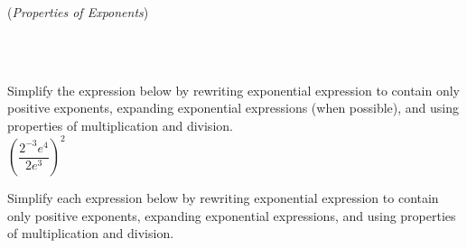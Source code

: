 \documentclass[10pt]{article}
\begin{document}
\thispagestyle{empty}


\vspace{0.1in}

\Name{} \quad {}

\hrulefill

\begin{center}
({\it Properties of Exponents})
\end{center}

\,\hfill
{}
\hfill
{}
\hfill
{}
\hfill
{}
\hfill
\,\\

\,\hfill\hfill
{}
\hfill
{}
\hfill
{}
\hfill\hfill\,



 Simplify the expression below by rewriting exponential expression to contain only positive exponents, expanding exponential expressions (when possible), and using properties of multiplication and division.\\

$\left( \dfrac{ 2^{-3}e^4 }{ 2e^3 } \right)^2$

{
\blue{\[\left( \dfrac{ 2^{-3}e^4 }{ 2e^3 } \right)^2 = \left( \dfrac{ e^{4-3} }{ 2\cdot2^{3} } \right)^2 = \left( \dfrac{ e }{ 2^{1+3} } \right)^2 = \left( \dfrac{ e }{ 2^4 } \right)\cdot\left( \dfrac{ e }{ 2^4 } \right) = \dfrac{ e^{1+1} }{ 2^{4+4} } = \fbox{$\dfrac{e^2}{2^8}$}\]
}}

 Simplify each expression below by rewriting exponential expression to contain only positive exponents, expanding exponential expressions, and using properties of multiplication and division.
\end{document}
